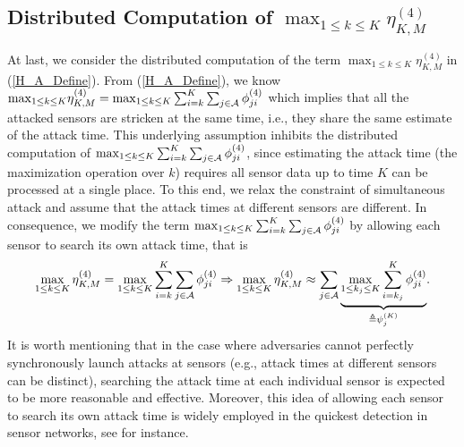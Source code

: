 \documentclass[11pt, draftclsnofoot, onecolumn]{IEEEtran}
\begin{document}




\subsection{Distributed Computation of $ {\max }_{1 \le k \le K}  \eta _{K,M}^{(4)}$}

At last, we consider the distributed computation of the term $ {\max }_{1 \le k \le K} \eta _{K,M}^{(4)}$ in (\ref{H_A_Define}).
From (\ref{H_A_Define}), we know $ {\max }_{1 \le k \le K} \eta _{K,M}^{(4)} = {\max }_{1 \le k \le K} \sum_{i = k}^K {\sum_{j \in {\cal A}} {\phi _{ji}^{\left( 4 \right)}} } $ which implies that all the attacked sensors are stricken at the same time, i.e., they share the same estimate of the attack time. This underlying assumption inhibits the distributed computation of $ {\max }_{1 \le k \le K} \sum_{i = k}^K {\sum_{j \in {\cal A}} {\phi _{ji}^{\left( 4 \right)}} } $, since estimating the attack time (the maximization operation over $k$) requires all sensor data up to time $K$ can be   processed   at a single place.
To this end,   we relax the constraint of simultaneous attack and assume that the attack times at different sensors  are different.   In consequence, we modify the term  $ {\max }_{1 \le k \le K} \sum_{i = k}^K {\sum_{j \in {\cal A}} {\phi _{ji}^{\left( 4 \right)}} } $ by allowing each sensor to search its own attack time, that is
\begin{equation} \label{relaxation}
\mathop {\max }\limits_{1 \le k \le K} \eta _{K,M}^{(4)} = \mathop {\max }\limits_{1 \le k \le K} \sum\limits_{i = k}^K {\sum\limits_{j \in {\cal A}} {\phi _{ji}^{\left( 4 \right)}} }  \Rightarrow \mathop {\max }\limits_{1 \le k \le K} \eta _{K,M}^{(4)} \approx \sum\limits_{j \in {\cal A}} {\underbrace {\mathop {\max }\limits_{1 \le k_j \le K} \sum\limits_{i = k_j}^K {\phi _{ji}^{\left( 4 \right)}} }_{\triangleq \psi _j^{(K)}}}.
\end{equation}
It is worth mentioning that in the case where adversaries cannot perfectly synchronously launch attacks at sensors  (e.g., attack times at different sensors can be distinct), searching the attack time at each individual sensor is expected to be more reasonable and effective. Moreover, this idea of allowing each sensor to search its own attack time is widely employed in the quickest detection in sensor networks, see \cite{mei2010efficient, li2015quickest, liu2017distributed} for instance.
\end{document}

